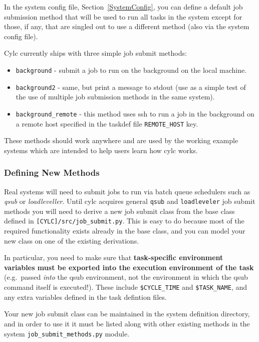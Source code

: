 \documentclass[11pt,a4paper]{article}
\begin{document}
In the system config file, Section~\ref{SystemConfig}, you can define a
default job submission method that will be used to run all tasks in the
system except for those, if any, that are singled out to use a different
method (also via the system config file).

Cylc currently ships with three simple job submit methods:

\begin{itemize}
    \item \lstinline=background= - submit a job to run on the background
        on the local machine. 
     \item \lstinline=background2= - same, but print a message to stdout
         (use as a simple test of the use of multiple job submission
         methods in the same system). 
     \item \lstinline=background_remote= - this method uses ssh to 
         run a job in the background on a remote host specified in 
         the taskdef file \lstinline=REMOTE_HOST= key.
 \end{itemize}

These methods should work anywhere and are used by the working example
systems which are intended to help users learn how cylc works. 

\subsubsection{Defining New Methods}
 
Real systems will need to submit jobs to run via batch queue schedulers
such as {\em qsub} or {\em loadleveller}. Until cylc acquires general
\lstinline=qsub= and \lstinline=loadleveler= job submit methods you will
need to derive a new job submit class from the base class defined in
\lstinline=[CYLC]/src/job_submit.py=. This is easy to do because most of
the required functionality exists already in the base class, and you can
model your new class on one of the existing derivations.

In particular, you need to make sure that {\bf task-specific
environment variables must be exported into the execution environment of
the task} (e.g.\ passed {\em into} the qsub environment, not the
environment in which the qsub command itself is executed!). These 
include \lstinline=$CYCLE_TIME= and \lstinline=$TASK_NAME=, and
any extra variables defined in the task defintion files.

Your new job submit class can be maintained in the system definition
directory, and in order to use it it must be listed along with other 
existing methods in the system \lstinline=job_submit_methods.py= module.
\end{document}
